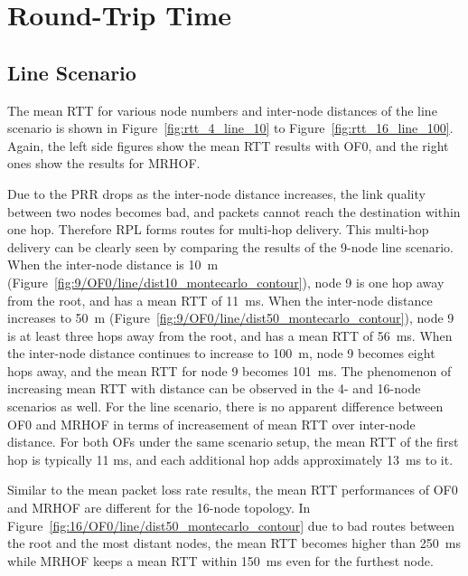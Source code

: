 \section{Round-Trip Time}
\label{rtt}

\subsection{Line Scenario}
\label{rtt:line}

The mean RTT for various node numbers and inter-node distances of the line scenario is shown in Figure~\ref{fig:rtt_4_line_10} to Figure~\ref{fig:rtt_16_line_100}. Again, the left side figures show the mean RTT results with OF0, and the right ones show the results for MRHOF.

Due to the PRR drops as the inter-node distance increases, the link quality between two nodes becomes bad, and packets cannot reach the destination within one hop. Therefore RPL forms routes for multi-hop delivery. This multi-hop delivery can be clearly seen by comparing the results of the 9-node line scenario. When the inter-node distance is 10~m (Figure~\ref{fig:9/OF0/line/dist10_montecarlo_contour}), node 9 is one hop away from the root, and has a mean RTT of 11~ms.  When the inter-node distance increases to 50~m (Figure~\ref{fig:9/OF0/line/dist50_montecarlo_contour}), node 9 is at least three hops away from the root, and has a mean RTT of 56~ms.  When the inter-node distance continues to increase to 100~m, node 9 becomes eight hops away, and the mean RTT for node 9 becomes 101~ms.  The phenomenon of increasing mean RTT with distance can be observed in the 4- and 16-node scenarios as well. For the line scenario, there is no apparent difference between OF0 and MRHOF in terms of increasement of mean RTT over inter-node distance. For both OFs under the same scenario setup, the mean RTT of the first hop is typically 11 ms, and each additional hop adds approximately 13~ms to it.

Similar to the mean packet loss rate results, the mean RTT performances of OF0 and MRHOF are different for the 16-node topology. In Figure~\ref{fig:16/OF0/line/dist50_montecarlo_contour} due to bad routes between the root and the most distant nodes, the mean RTT becomes higher than 250~ms while MRHOF keeps a mean RTT within 150~ms even for the furthest node.

